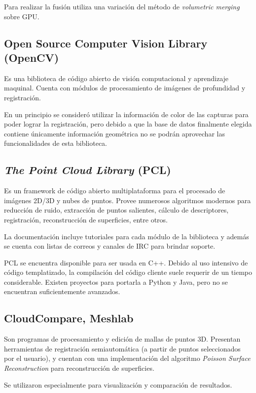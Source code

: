 	Para realizar la fusión utiliza una variación del método de
	\emph{volumetric merging} sobre GPU\cite{Izadi:2011:KRR:2047196.2047270}.





	\subsection{Open Source Computer Vision Library (OpenCV)}
	Es una biblioteca de código abierto de visión computacional y aprendizaje
	maquinal.  Cuenta con módulos de procesamiento de imágenes de profundidad y
	registración.

	En un principio se consideró utilizar la información de color de las capturas
	para poder lograr la registración, pero debido a que la base de datos
	finalmente elegida contiene únicamente información geométrica
	no se podrán aprovechar las funcionalidades de esta biblioteca.

	\subsection{\emph{The Point Cloud Library} (PCL)}
	Es un framework de código abierto multiplataforma para el procesado de
	imágenes 2D/3D y nubes de puntos.
	Provee numerosos algoritmos modernos para reducción de ruido, extracción de
	puntos salientes, cálculo de descriptores, registración, reconstrucción de
	superficies, entre otros.

	La documentación incluye tutoriales para cada módulo de la biblioteca y
	además se cuenta con listas de correos y canales de IRC para brindar
	soporte.

	PCL se encuentra disponible para ser usada en C++.
	Debido al uso intensivo de código templatizado, la compilación del
	código cliente suele requerir de un tiempo considerable.
	Existen proyectos para portarla a Python y Java, pero no se encuentran
	suficientemente avanzados.

	\subsection{CloudCompare, Meshlab}
	Son programas de procesamiento y edición de mallas de puntos 3D.  Presentan
	herramientas de registración semiautomática (a partir de puntos
	seleccionados por el usuario), y cuentan con una implementación del
	algoritmo \emph{Poisson Surface Reconstruction} para reconstrucción de
	superficies.

	Se utilizaron especialmente para visualización y comparación de resultados.
